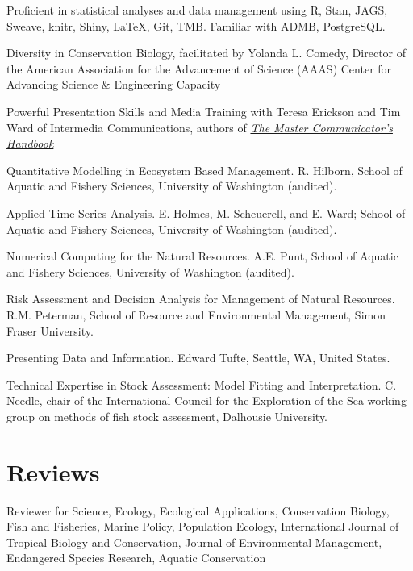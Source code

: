 \begin{description}
\tightlist
\item[Present]
Proficient in statistical analyses and data management using R, Stan,
JAGS, Sweave, knitr, Shiny, LaTeX, Git, TMB. Familiar with ADMB,
PostgreSQL.
\item[2016]
Diversity in Conservation Biology, facilitated by Yolanda L. Comedy,
Director of the American Association for the Advancement of Science
(AAAS) Center for Advancing Science \& Engineering Capacity
\item[2015--16]
Powerful Presentation Skills and Media Training with Teresa Erickson and
Tim Ward of Intermedia Communications, authors of
\href{https://www.amazon.com/Master-Communicators-Handbook-Teresa-Erickson/dp/1785351532}{\emph{The
Master Communicator's Handbook}}
\item[2013]
Quantitative Modelling in Ecosystem Based Management. R. Hilborn, School
of Aquatic and Fishery Sciences, University of Washington (audited).
\item[2013]
Applied Time Series Analysis. E. Holmes, M. Scheuerell, and E. Ward;
School of Aquatic and Fishery Sciences, University of Washington
(audited).
\item[2012]
Numerical Computing for the Natural Resources. A.E. Punt, School of
Aquatic and Fishery Sciences, University of Washington (audited).
\item[2012]
Risk Assessment and Decision Analysis for Management of Natural
Resources. R.M. Peterman, School of Resource and Environmental
Management, Simon Fraser University.
\item[2011]
Presenting Data and Information. Edward Tufte, Seattle, WA, United
States.
\item[2009]
Technical Expertise in Stock Assessment: Model Fitting and
Interpretation. C. Needle, chair of the International Council for the
Exploration of the Sea working group on methods of fish stock
assessment, Dalhousie University.
\end{description}

\section{Reviews}\label{reviews}

Reviewer for Science, Ecology, Ecological Applications, Conservation
Biology, Fish and Fisheries, Marine Policy, Population Ecology,
International Journal of Tropical Biology and Conservation, Journal of
Environmental Management, Endangered Species Research, Aquatic
Conservation
